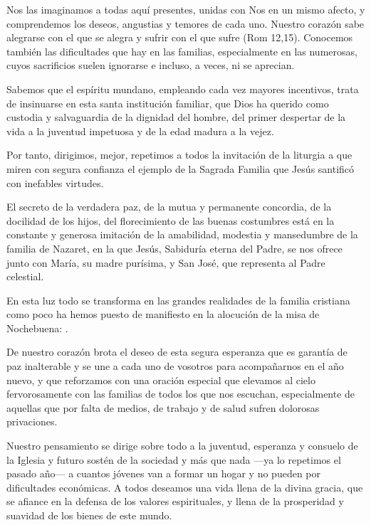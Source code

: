 \begin{body}
\begin{body}
Nos las imaginamos a todas aquí presentes, unidas con Nos en un mismo afecto, y comprendemos los deseos, angustias y temores de cada uno. Nuestro corazón sabe alegrarse con el que se alegra y sufrir con el que sufre (Rom 12,15). Conocemos también las dificultades que hay en las familias, especialmente en las numerosas, cuyos sacrificios suelen ignorarse e incluso, a veces, ni se aprecian.

Sabemos que el espíritu mundano, empleando cada vez mayores incentivos, trata de insinuarse en esta santa institución familiar, que Dios ha querido como custodia y salvaguardia de la dignidad del hombre, del primer despertar de la vida a la juventud impetuosa y de la edad madura a la vejez.

Por tanto, dirigimos, mejor, repetimos a todos la invitación de la liturgia a que miren con segura confianza el ejemplo de la Sagrada Familia que Jesús santificó con inefables virtudes.

El secreto de la verdadera paz, de la mutua y permanente concordia, de la docilidad de los hijos, del florecimiento de las buenas costumbres está en la constante y generosa imitación de la amabilidad, modestia y mansedumbre de la familia de Nazaret, en la que Jesús, Sabiduría eterna del Padre, se nos ofrece junto con María, su madre purísima, y San José, que representa al Padre celestial.

En esta luz todo se transforma en las grandes realidades de la familia cristiana como poco ha hemos puesto de manifiesto en la alocución de la misa de Nochebuena: .

De nuestro corazón brota el deseo de esta segura esperanza que es garantía de paz inalterable y se une a cada uno de vosotros para acompañarnos en el año nuevo, y que reforzamos con una oración especial que elevamos al cielo fervorosamente con las familias de todos los que nos escuchan, especialmente de aquellas que por falta de medios, de trabajo y de salud sufren dolorosas privaciones.

Nuestro pensamiento se dirige sobre todo a la juventud, esperanza y consuelo de la Iglesia y futuro sostén de la sociedad y más que nada ---ya lo repetimos el pasado año--- a cuantos jóvenes van a formar un hogar y no pueden por dificultades económicas. A todos deseamos una vida llena de la divina gracia, que se afiance en la defensa de los valores espirituales, y llena de la prosperidad y suavidad de los bienes de este mundo.


\end{body}
\end{body}

